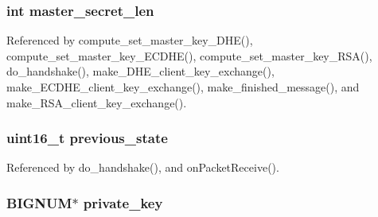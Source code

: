 \subsubsection[{\texorpdfstring{master\+\_\+secret\+\_\+len}{master_secret_len}}]{\setlength{\rightskip}{0pt plus 5cm}int master\+\_\+secret\+\_\+len}\hypertarget{struct_t_l_s__parameters__t_a7112487b636ca7921055d94ae02478fe}{}\label{struct_t_l_s__parameters__t_a7112487b636ca7921055d94ae02478fe}


Referenced by compute\+\_\+set\+\_\+master\+\_\+key\+\_\+\+D\+H\+E(), compute\+\_\+set\+\_\+master\+\_\+key\+\_\+\+E\+C\+D\+H\+E(), compute\+\_\+set\+\_\+master\+\_\+key\+\_\+\+R\+S\+A(), do\+\_\+handshake(), make\+\_\+\+D\+H\+E\+\_\+client\+\_\+key\+\_\+exchange(), make\+\_\+\+E\+C\+D\+H\+E\+\_\+client\+\_\+key\+\_\+exchange(), make\+\_\+finished\+\_\+message(), and make\+\_\+\+R\+S\+A\+\_\+client\+\_\+key\+\_\+exchange().

\subsubsection[{\texorpdfstring{previous\+\_\+state}{previous_state}}]{\setlength{\rightskip}{0pt plus 5cm}uint16\+\_\+t previous\+\_\+state}\hypertarget{struct_t_l_s__parameters__t_a7876cd7f12771bb13dfd180e2d74e02b}{}\label{struct_t_l_s__parameters__t_a7876cd7f12771bb13dfd180e2d74e02b}


Referenced by do\+\_\+handshake(), and on\+Packet\+Receive().

\subsubsection[{\texorpdfstring{private\+\_\+key}{private_key}}]{\setlength{\rightskip}{0pt plus 5cm}B\+I\+G\+N\+UM$\ast$ private\+\_\+key}\hypertarget{struct_t_l_s__parameters__t_aa7d109714bb4c1faa6aba18c0dd3dcae}{}\label{struct_t_l_s__parameters__t_aa7d109714bb4c1faa6aba18c0dd3dcae}


